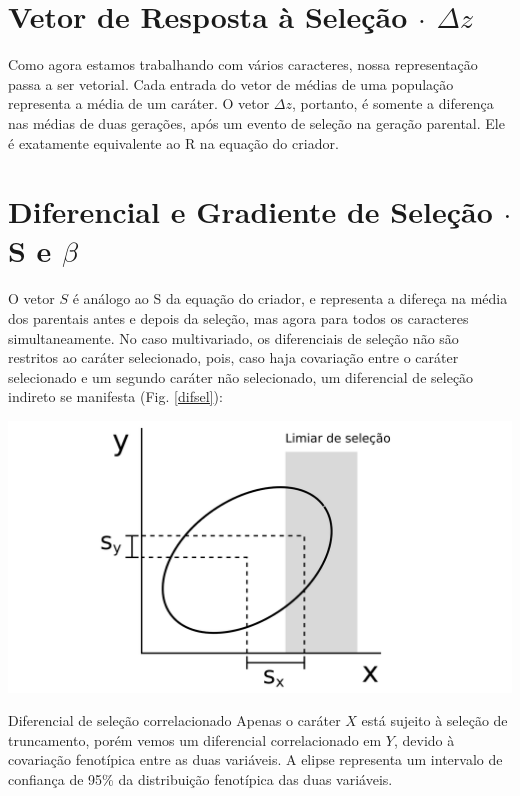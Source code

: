 \documentclass[portuges,]{tufte-handout}
\begin{document}
\section{Vetor de Resposta à Seleção \(\cdot\)
\(\Delta z\)}\label{vetor-de-resposta-uxe0-seleuxe7uxe3o-cdot-delta-z}

Como agora estamos trabalhando com vários caracteres, nossa
representação passa a ser vetorial. Cada entrada do vetor de médias de
uma população representa a média de um caráter. O vetor \(\Delta z\),
portanto, é somente a diferença nas médias de duas gerações, após um
evento de seleção na geração parental. Ele é exatamente equivalente ao R
na equação do criador.

\section{Diferencial e Gradiente de Seleção \(\cdot\) S e
\(\beta\)}\label{diferencial-e-gradiente-de-seleuxe7uxe3o-cdot-s-e-beta}

O vetor \(S\) é análogo ao S da equação do criador, e representa a
difereça na média dos parentais antes e depois da seleção, mas agora
para todos os caracteres simultaneamente. No caso multivariado, os
diferenciais de seleção não são restritos ao caráter selecionado, pois,
caso haja covariação entre o caráter selecionado e um segundo caráter
não selecionado, um diferencial de seleção indireto se manifesta (Fig.
\ref{difsel}):

\begin{marginfigure}
\includegraphics{./figuras/diferencialdeselecao.png}
\caption{Diferencial de seleção correlacionado Apenas o caráter
\(X\) está sujeito à seleção de truncamento, porém vemos um diferencial
correlacionado em \(Y\), devido à covariação fenotípica entre as duas
variáveis. A elipse representa um intervalo de confiança de 95\% da
distribuição fenotípica das duas variáveis.}
\label{difsel}
\end{marginfigure}
\end{document}
